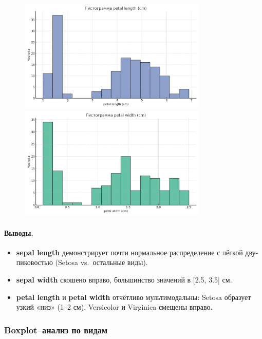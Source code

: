 \begin{figure}[H]\ContinuedFloat
  \centering
  \includegraphics[width=0.8\textwidth]{images/histo_petal_length_cm_cb2.png}\\[6pt]
  \includegraphics[width=0.8\textwidth]{images/histo_petal_width_cm_cb2.png}
\end{figure}

\paragraph{Выводы.}
\begin{itemize}
  \item \textbf{sepal length} демонстрирует почти нормальное распределение с лёгкой дву­пиковостью (Setosa vs.~остальные виды).
  \item \textbf{sepal width} скошено вправо, большинство значений в [2.5, 3.5] см.
  \item \textbf{petal length} и \textbf{petal width} отчётливо мультимодальны: Setosa образует узкий «низ» (1–2 см), Versicolor и Virginica смещены вправо.
\end{itemize}

\subsubsection{Boxplot–анализ по видам}

